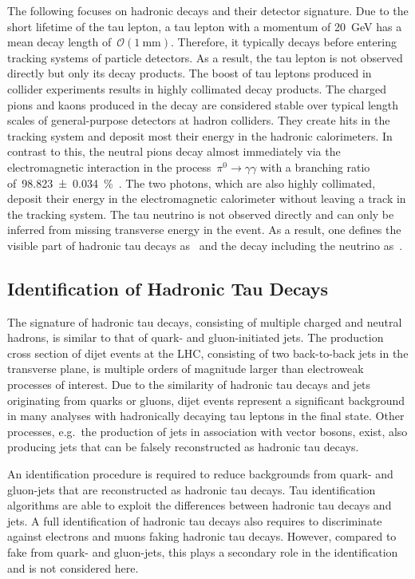 The following focuses on hadronic decays and their detector signature. Due to
the short lifetime of the tau lepton, a tau lepton with a momentum of
\SI{20}{\GeV} has a mean decay length of~$\mathcal{O}(\SI{1}{\milli\metre})$.
Therefore, it typically decays before entering tracking systems of particle
detectors. As a result, the tau lepton is not observed directly but only its
decay products. The boost of tau leptons produced in collider experiments
results in highly collimated decay products. The charged pions and kaons
produced in the decay are considered stable over typical length scales of
general-purpose detectors at hadron colliders. They create hits in the tracking
system and deposit most their energy in the hadronic calorimeters. In contrast
to this, the neutral pions decay almost immediately via the electromagnetic
interaction in the process~\mbox{$\pi^0 \to \gamma\gamma$} with a branching
ratio of~\SI{98.823 +- 0.034}{\percent}~\cite{pdg}. The two photons, which are
also highly collimated, deposit their energy in the electromagnetic calorimeter
without leaving a track in the tracking system. The tau neutrino is not observed
directly and can only be inferred from missing transverse energy in the event.
As a result, one defines the visible part of hadronic tau decays as~\tauhadvis
and the decay including the neutrino as~\tauhad.

\subsection{Identification of Hadronic Tau Decays}
\label{sec:features_tau_decay}

The signature of hadronic tau decays, consisting of multiple charged and neutral
hadrons, is similar to that of quark- and gluon-initiated jets. The production
cross section of dijet events at the LHC, consisting of two back-to-back jets in
the transverse plane, is multiple orders of magnitude larger than electroweak
processes of interest. Due to the similarity of hadronic tau decays and jets
originating from quarks or gluons, dijet events represent a significant
background in many analyses with hadronically decaying tau leptons in the final
state. Other processes, e.g.\ the production of jets in association with vector
bosons, exist, also producing jets that can be falsely reconstructed as hadronic
tau decays.

An identification procedure is required to reduce backgrounds from quark- and
gluon-jets that are reconstructed as hadronic tau decays. Tau identification
algorithms are able to exploit the differences between hadronic tau decays and
jets. A full identification of hadronic tau decays also requires to discriminate
against electrons and muons faking hadronic tau decays. However, compared to
fake \tauhad from quark- and gluon-jets, this plays a secondary role in the
identification and is not considered here.

